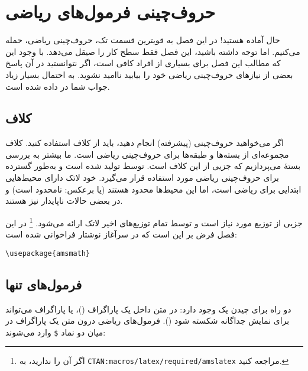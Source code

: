 \chapter{حروف‌چینی فرمول‌های ریاضی}


\begin{intro}

حال آماده هستید! در این فصل به قویترین قسمت تک، حروف‌چینی ریاضی، حمله می‌کنیم. اما توجه داشته باشید، این فصل فقط سطح کار را صیقل می‌دهد. با ‌وجود این که مطالب این فصل برای بسیاری از افراد کافی است، اگر نتوانستید در آن پاسخ بعضی از نیازهای حروف‌چینی ریاضی خود را بیابید نا‌امید نشوید. به احتمال بسیار زیاد جواب شما در  \lr{\AmS-\LaTeX{}} داده شده است.
\end{intro}
\section{\texorpdfstring{کلاف }{کلاف AMS-Latex}}
اگر می‌خواهید حروف‌چینی (پیشرفته)
انجام دهید، باید از کلاف 
\lr{\AmS-\LaTeX} 
استفاده کنید. کلاف 
\lr{\AmS-\LaTeX} 
مجموعه‌ای از بسته‌ها و طبقه‌ها برای حروف‌چینی ریاضی است. ما بیشتر به بررسی بستۀ 
می‌پردازیم که جزیی از این کلاف است. 
\lr{\AmS-\LaTeX} 
توسط  تولید شده است و به‌طور گسترده برای حروف‌چینی ریاضی مورد استفاده قرار می‌گیرد. خود لاتک دارای محیط‌هایی ابتدایی برای ریاضی است، اما این محیط‌ها محدود هستند 
(یا برعکس: \lr{\AmS-\LaTeX} نامحدود است)
و در بعضی حالات ناپایدار نیز هستند.

\lr{\AmS-\LaTeX} 
جزیی از توزیع مورد نیاز است و توسط تمام توزیع‌های اخیر لاتک ارائه می‌شود.%
\footnote{اگر آن را ندارید، به 
  \texttt{CTAN:macros/latex/required/amslatex} مراجعه کنید.} 
در این فصل فرض بر این است که  در سرآغاز نوشتار‌ فراخوانی شده است:

\begin{code}
\verb|\usepackage{amsmath}|
\end{code}
\section{فرمول‌های تنها}

دو راه برای چیدن یک  وجود دارد: در متن داخل یک پاراگراف 
()، 
یا پاراگراف می‌تواند برای نمایش جداگانه شکسته شود 
(). 
فرمول‌های ریاضی {\femph درون} 
متن  یک پاراگراف در میان دو نماد  \texttt{\$} وارد می‌شوند:

